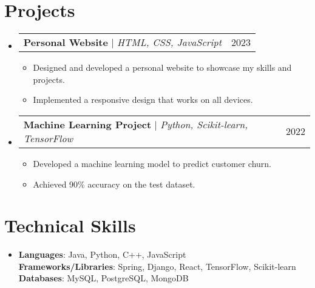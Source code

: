 \documentclass[letterpaper,11pt]{article}
\makeatletter
\newcommand{\resumeItem}[1]{
\item\small{
{#1 \vspace{-2pt}}
}
}
\newcommand{\resumeProjectHeading}[2]{
\item
\begin{tabular*}{0.97\textwidth}{l@{\extracolsep{\fill}}r}
\small#1 & #2 \\
\end{tabular*}\vspace{-7pt}
}
\newcommand{\resumeSubHeadingListStart}{\begin{itemize}[leftmargin=0.15in, label={}]}
\newcommand{\resumeSubHeadingListEnd}{\end{itemize}}
\newcommand{\resumeItemListStart}{\begin{itemize}}
\newcommand{\resumeItemListEnd}{\end{itemize}\vspace{-5pt}}
\makeatother
\begin{document}
\section{Projects}
\resumeSubHeadingListStart
\resumeProjectHeading{\textbf{Personal Website} $|$ \emph{HTML, CSS, JavaScript}}{2023}
\resumeItemListStart
\resumeItem{Designed and developed a personal website to showcase my skills and projects.}
\resumeItem{Implemented a responsive design that works on all devices.}
\resumeItemListEnd
\resumeSubHeadingListEnd

\resumeSubHeadingListStart
\resumeProjectHeading{\textbf{Machine Learning Project} $|$ \emph{Python, Scikit-learn, TensorFlow}}{2022}
\resumeItemListStart
\resumeItem{Developed a machine learning model to predict customer churn.}
\resumeItem{Achieved 90\% accuracy on the test dataset.}
\resumeItemListEnd
\resumeSubHeadingListEnd

\section{Technical Skills} %
\begin{itemize}[leftmargin=0.15in, label={}]
\item{
\textbf{Languages}{: Java, Python, C++, JavaScript} \\
\textbf{Frameworks/Libraries}{: Spring, Django, React, TensorFlow, Scikit-learn} \\
\textbf{Databases}{: MySQL, PostgreSQL, MongoDB}
} \\
\end{itemize}


\end{document}
